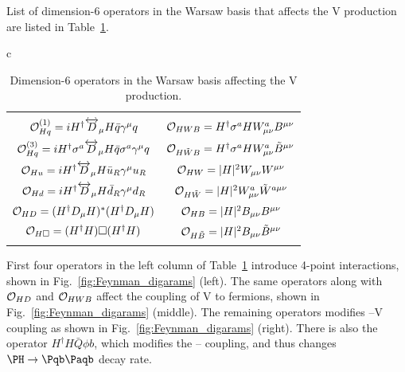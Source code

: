 \documentclass[a4paper,11pt]{article}
\newcommand{\Pb}{{{\Pqb}}\xspace}
\newcommand{\PAb}{{{{\Paqb}}}\xspace}
\renewcommand{\PV}{{{{V}}}\xspace}
\newcommand{\VH}{{{\PV}{\PH}}\xspace}
\begin{document}
List of dimension-6 operators in the Warsaw basis that affects the \VH production are listed in Table~\ref{Tab:Operators}.
\begin{table}[hbtp]
\small
\centering
\caption{
Dimension-6 operators in the Warsaw basis affecting the \VH production. %
}
\begin{tabular}{c}
\begin{tabular}{c|c}
&\\
                ${\cal O}^{(1)}_{Hq}=i H^\dagger  \overleftrightarrow{D}_\mu H \bar{q}   \gamma^\mu q$&${\cal O}_{HWB}=  H^\dagger \sigma^a H W^a_{\mu\nu}B^{\mu\nu}$ \\
\rule{0pt}{4ex} ${\cal O}^{(3)}_{Hq}=i H^\dagger \sigma^a \overleftrightarrow{D}_\mu H \bar{q}  \sigma^a \gamma^\mu q$ &${\cal O}_{H\tilde{W}B}=  H^\dagger \sigma^a H W^a_{\mu\nu}\tilde{B}^{\mu\nu}$\\
\rule{0pt}{4ex} ${\cal O}_{Hu}=i H^\dagger \overleftrightarrow{D}_\mu H \bar{u}_R  \gamma^\mu u_R$&${\cal O}_{H{W}}= |H|^2 W_{\mu\nu}{W}^{\mu\nu}$\\
\rule{0pt}{4ex} ${\cal O}_{Hd}=i H^\dagger \overleftrightarrow{D}_\mu H \bar{d}_R  \gamma^\mu d_R$&${\cal O}_{H\tilde{W}}= |H|^2 W^a_{\mu\nu}\tilde{W}^{a \mu\nu}$\\
\rule{0pt}{4ex} ${\cal O}_{HD}=(H^\dagger  {D}_\mu H)^*(H^\dagger  {D}_\mu H)$& ${\cal O}_{HB}= |H|^2 B_{\mu\nu}B^{\mu\nu}$\\
\rule{0pt}{4ex} ${\cal O}_{H\square}=(H^\dagger H) \square (H^\dagger H)$& ${\cal O}_{H\tilde{B}}= |H|^2 B_{\mu\nu}\tilde{B}^{\mu\nu}$\\
&\\
 \end{tabular}
\end{tabular}
\label{Tab:Operators}
\end{table}
First four operators in the left column of Table~\ref{Tab:Operators} introduce 4-point interactions, shown in Fig.~\ref{fig:Feynman_digarams} (left). 
The same operators along with ${\cal O}_{HD}$ and ${\cal O}_{HWB}$ affect the coupling of \PV to fermions, shown in Fig.~\ref{fig:Feynman_digarams} (middle). 
The remaining operators modifies \PH--\PV coupling as shown in Fig.~\ref{fig:Feynman_digarams} (right). 
There is also the operator $H^\dagger H \bar{Q}\phi b$, which modifies the \PH--\Pb coupling, and thus changes $\PH \to \Pb \PAb$ decay rate. 
\end{document}
